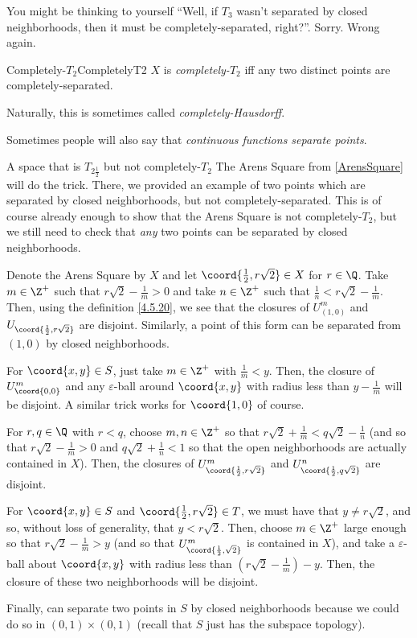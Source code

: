 You might be thinking to yourself ``Well, if $T_3$ wasn't separated by closed neighborhoods, then it must be completely-separated, right?''.  Sorry.  Wrong again.
\begin{dfn}{Completely-$T_2$}{CompletelyT2}
$X$ is \emph{completely-$T_2$} iff any two distinct points are completely-separated.
\begin{rmk}
Naturally, this is sometimes called \emph{completely-Hausdorff}.
\end{rmk}
\begin{rmk}
Sometimes people will also say that \emph{continuous functions separate points}.
\end{rmk}
\end{dfn}
\begin{exm}{A space that is $T_{2\frac{1}{2}}$ but not completely-$T_2$}{}
The Arens Square from \cref{ArensSquare} will do the trick.  There, we provided an example of two points which are separated by closed neighborhoods, but not completely-separated.  This is of course already enough to show that the Arens Square is not completely-$T_2$, but we still need to check that \emph{any} two points can be separated by closed neighborhoods.

Denote the Arens Square by $X$ and let $\coord{\frac{1}{2},r\sqrt{2}}\in X$ for $r\in \Q$.  Take $m\in \Z ^+$ such that $r\sqrt{2}-\frac{1}{m}>0$ and take $n\in \Z ^+$ such that $\frac{1}{n}<r\sqrt{2}-\frac{1}{m}$.  Then, using the definition \eqref{4.5.20}, we see that the closures of $U_{(1,0)}^m$ and $U_{\coord{\frac{1}{2},r\sqrt{2}}}$ are disjoint.  Similarly, a point of this form can be separated from $(1,0)$ by closed neighborhoods.

For $\coord{x,y}\in S$, just take $m\in \Z ^+$ with $\frac{1}{m}<y$.  Then, the closure of $U_{\coord{0,0}}^m$ and any $\varepsilon$-ball around $\coord{x,y}$ with radius less than $y-\frac{1}{m}$ will be disjoint.  A similar trick works for $\coord{1,0}$ of course.

For $r,q\in \Q$ with $r<q$, choose $m,n\in \Z ^+$ so that $r\sqrt{2}+\frac{1}{m}<q\sqrt{2}-\frac{1}{n}$ (and so that $r\sqrt{2}-\frac{1}{m}>0$ and $q\sqrt{2}+\frac{1}{n}<1$ so that the open neighborhoods are actually contained in $X$).  Then, the closures of $U_{\coord{\frac{1}{2},r\sqrt{2}}}^m$ and $U_{\coord{\frac{1}{2},q\sqrt{2}}}^n$ are disjoint.

For $\coord{x,y}\in S$ and $\coord{\frac{1}{2},r\sqrt{2}}\in T$, we must have that $y\neq r\sqrt{2}$, and so, without loss of generality, that $y<r\sqrt{2}$.  Then, choose $m\in \Z ^+$ large enough so that $r\sqrt{2}-\frac{1}{m}>y$ (and so that $U_{\coord{\frac{1}{2},\sqrt{2}}}^m$ is contained in $X$), and take a $\varepsilon$-ball about $\coord{x,y}$ with radius less than $(r\sqrt{2}-\frac{1}{m})-y$.  Then, the closure of these two neighborhoods will be disjoint.

Finally, can separate two points in $S$ by closed neighborhoods because we could do so in $(0,1)\times (0,1)$ (recall that $S$ just has the subspace topology).
\end{exm}
